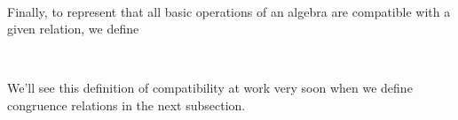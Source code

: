 \documentclass[a4paper,UKenglish,cleveref,autoref,thm-restate,11pt]{lipics-v2021}
\begin{document}
\begin{code}
\>[1]\AgdaSpace{}%
\AgdaSymbol{:}\AgdaSpace{}%
\AgdaSymbol{\{}\AgdaSpace{}%
\AgdaSymbol{:}\AgdaSpace{}%
\AgdaSpace{}%
\AgdaSpace{}%
\AgdaSymbol{\}}\AgdaSpace{}%
\AgdaSpace{}%
\AgdaSpace{}%
\AgdaSpace{}%
\AgdaSpace{}%
\AgdaSpace{}%
\AgdaSpace{}%
\AgdaSpace{}%
\AgdaSpace{}%
\AgdaSpace{}%
\AgdaSpace{}%
\AgdaSpace{}%
\AgdaSpace{}%
\AgdaSpace{}%
\AgdaSpace{}%
\AgdaSpace{}%
%
\<%
\\
%
\>[1]\AgdaSpace{}%
\AgdaSymbol{\{}\AgdaSymbol{\}}\AgdaSpace{}%
\AgdaSpace{}%
\AgdaSpace{}%
\AgdaSymbol{=}\AgdaSpace{}%
\AgdaSymbol{\}\{}\AgdaSymbol{\}}\AgdaSpace{}%
\AgdaSpace{}%
\AgdaSymbol{(}\AgdaSpace{}%
\AgdaSymbol{)}\AgdaSpace{}%
\AgdaSpace{}%
%
\>[53]\AgdaSpace{}%
\AgdaSpace{}%
\AgdaSymbol{((}\AgdaSpace{}%
\AgdaSpace{}%
\AgdaSymbol{)}\AgdaSpace{}%
\AgdaSymbol{)}\AgdaSpace{}%
\AgdaSymbol{((}\AgdaSpace{}%
\AgdaSpace{}%
\AgdaSymbol{)}\AgdaSpace{}%
\AgdaSymbol{)}\<%
\end{code}
\ccpad
Finally, to represent that all basic operations of an algebra are compatible with a given relation, we define
\ccpad
\begin{code}
\>[1]\AgdaSpace{}%
\AgdaSymbol{:}{\AgdaSpace{}}%
\AgdaSymbol{(}\AgdaSpace{}%
\AgdaSymbol{:}\AgdaSpace{}%
\AgdaSpace{}%
\AgdaSpace{}%
\AgdaSymbol{)}\AgdaSpace{}%
\AgdaSpace{}%
\AgdaSpace{}%
\AgdaSpace{}%
\AgdaSpace{}%
\AgdaSpace{}%
\AgdaSpace{}%
\AgdaSpace{}%
\AgdaSpace{}%
\AgdaSpace{}%
\AgdaSpace{}%
\AgdaSpace{}%
\AgdaSpace{}%
\AgdaSpace{}%
%
\<%
\\
%
\>[1]%
\>[13]\AgdaSpace{}%
\AgdaSpace{}%
\AgdaSymbol{=}\AgdaSpace{}%
\AgdaSpace{}%
\AgdaSpace{}%
\AgdaSpace{}%
\AgdaSymbol{\{}\AgdaSymbol{\}}\AgdaSpace{}%
\AgdaSpace{}%
\<%
\end{code}
\ccpad
We'll see this definition of compatibility at work very soon when we define congruence relations in the next subsection.
\end{document}
